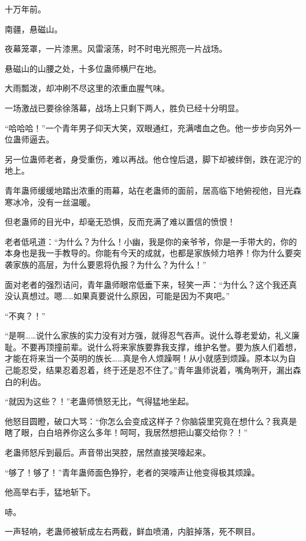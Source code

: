 
\begin{this_body}

十万年前。

南疆，悬磁山。

夜幕笼罩，一片漆黑。风雷滚荡，时不时电光照亮一片战场。

悬磁山的山腰之处，十多位蛊师横尸在地。

大雨瓢泼，却冲刷不尽这里的浓重血腥气味。

一场激战已要徐徐落幕，战场上只剩下两人，胜负已经十分明显。

“哈哈哈！”一个青年男子仰天大笑，双眼通红，充满嗜血之色。他一步步向另外一位蛊师逼去。

另一位蛊师老者，身受重伤，难以再战。他仓惶后退，脚下却被绊倒，跌在泥泞的地上。

青年蛊师缓缓地踏出浓重的雨幕，站在老蛊师的面前，居高临下地俯视他，目光森寒冰冷，没有一丝温暖。

但老蛊师的目光中，却毫无恐惧，反而充满了难以置信的愤恨！

老者低吼道：“为什么？为什么！小幽，我是你的亲爷爷，你是一手带大的，你的本身也是我一手教导的。你能有今天的成就，也都是家族倾力培养！你为什么要突袭家族的高层，为什么要恩将仇报？为什么？为什么！”

面对老者的强烈诘问，青年蛊师眼帘低垂下来，轻笑一声：“为什么？这个我还真没认真想过。嗯……如果真要说什么原因，可能是因为不爽吧。”

“不爽？！”

“是啊……说什么家族的实力没有对方强，就得忍气吞声。说什么尊老爱幼，礼义廉耻。不要再顶撞前辈。说什么将来家族要靠我支撑，维护名誉。要为族人们着想，才能在将来当一个英明的族长……真是令人烦躁啊！从小就感到烦躁。原本以为自己能忍受，结果忍着忍着，终于还是忍不住了。”青年蛊师说着，嘴角咧开，漏出森白的利齿。

“就因为这些？！”老蛊师愤怒无比，气得猛地坐起。

他怒目圆瞪，破口大骂：“你怎么会变成这样子？你脑袋里究竟在想什么？我真是瞎了眼，白白培养你这么多年！呵呵，我居然想把山寨交给你？！”

老蛊师怒斥到最后。声音带出哭腔，居然直接哭嚎起来。

“够了！够了！”青年蛊师面色狰狞，老者的哭嚎声让他变得极其烦躁。

他高举右手，猛地斩下。

哧。

一声轻响，老蛊师被斩成左右两截，鲜血喷涌，内脏掉落，死不瞑目。


\end{this_body}

